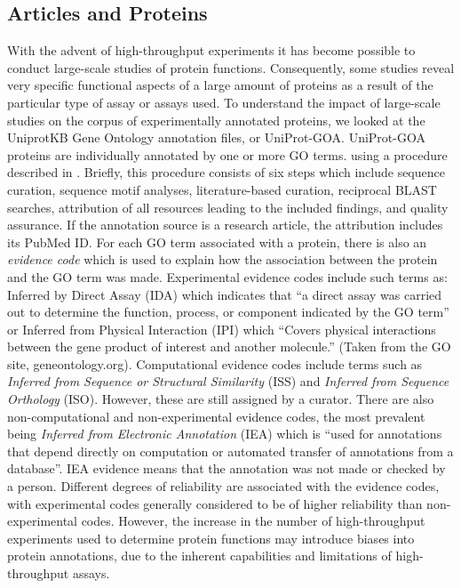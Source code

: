 \documentclass[12pt]{article}
\begin{document}
\subsection*{Articles and Proteins} With the advent of high-throughput experiments it has
become possible to conduct large-scale studies of protein functions.  Consequently, some
studies reveal very specific functional aspects of a large amount of proteins as a result of
the particular type of assay or assays used. To understand the impact of large-scale studies
on the corpus of experimentally annotated proteins, we looked at the UniprotKB Gene Ontology
annotation files, or UniProt-GOA. UniProt-GOA proteins are individually annotated by one or
more GO terms.  using a procedure described in \cite{Dimmer2012UniProtGO}. Briefly, this
procedure consists of six steps which include sequence curation, sequence motif analyses,
literature-based curation, reciprocal BLAST\cite{Altschul1997Gapped} searches, attribution
of all resources leading to the included findings, and quality assurance. If the annotation
source is a research article, the attribution includes its PubMed ID. For each GO term
associated with a protein, there is also an \textit{evidence code} which is used to explain
how the association between the protein and the GO term was made.  Experimental evidence
codes include such terms as: Inferred by Direct Assay (IDA) which indicates that ``a direct
assay was carried out to determine the function, process, or component indicated by the GO
term'' or Inferred from Physical Interaction (IPI) which ``Covers physical interactions
between the gene product of interest and another molecule.'' (Taken from the GO site,
geneontology.org).  Computational evidence codes include terms such as \textit{Inferred from
Sequence or Structural Similarity} (ISS) and \textit{Inferred from Sequence Orthology}
(ISO).  However, these are still assigned by a curator. There are also non-computational and
non-experimental evidence codes, the most prevalent being \textit{Inferred from Electronic
Annotation} (IEA) which is ``used for annotations that depend directly on computation or
automated transfer of annotations from a database''. IEA evidence means that the annotation
was not made or checked by a person.  Different degrees of reliability are associated with
the evidence codes, with experimental codes generally considered to be of higher reliability
than non-experimental codes. However, the increase in the number of high-throughput
experiments used to determine protein functions may introduce biases into protein
annotations, due to the inherent capabilities and limitations of high-throughput assays.  
\end{document}
